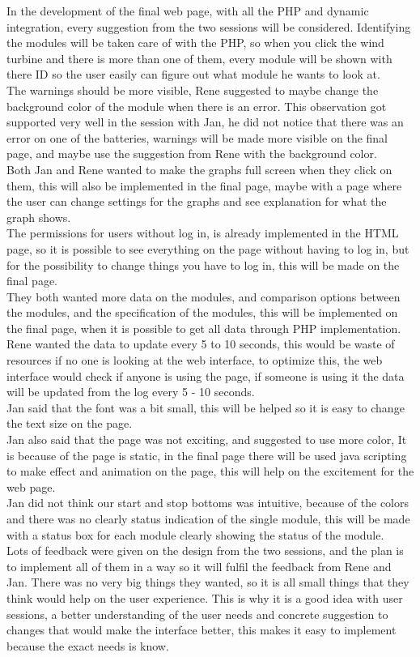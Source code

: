 In the development of the final web page, with all the PHP and dynamic integration, every suggestion from the two sessions will be considered. Identifying the modules will be taken care of with the PHP, so when you click the wind turbine and there is more than one of them, every module will be shown with there ID so the user easily can figure out what module he wants to look at.\\
The warnings should be more visible, Rene suggested to maybe change the background color of the module when there is an error. This observation got supported very well in the session with Jan, he did not notice that there was an error on one of the batteries, warnings will be made more visible on the final page, and maybe use the suggestion from Rene with the background color.\\
Both Jan and Rene wanted to make the graphs full screen when they click on them, this will also be implemented in the final page, maybe with a page where the user can change settings for the graphs and see explanation for what the graph shows.\\
The permissions for users without log in, is already implemented in the HTML page, so it is possible to see everything on the page without having to log in, but for the possibility to change things you have to log in, this will be made on the final page.\\
They both wanted more data on the modules, and comparison options between the modules, and the specification of the modules, this will be implemented on the final page, when it is possible to get all data through PHP implementation.\\
Rene wanted the data to update every 5 to 10 seconds, this would be waste of resources if no one is looking at the web interface, to optimize this, the web interface would check if anyone is using the page, if someone is using it the data will be updated from the log every 5 - 10 seconds.\\
Jan said that the font was a bit small, this will be helped so it is easy to change the text size on the page.\\
Jan also said that the page was not exciting, and suggested to use more color, It is because of the page is static, in the final page there will be used java scripting to make effect and animation on the page, this will help on the excitement for the web page.\\
Jan did not think our start and stop bottoms was intuitive, because of the colors and there was no clearly status indication of the single module, this will be made with a status box for each module clearly showing the status of the module.\\
Lots of feedback were given on the design from the two sessions, and the plan is to implement all of them in a way so it will fulfil the feedback from Rene and Jan. There was no very big things they wanted, so it is all small things that they think would help on the user experience. This is why it is a good idea with user sessions, a better understanding of the user needs and concrete suggestion to changes that would make the interface better, this makes it easy to implement because the exact needs is know.


